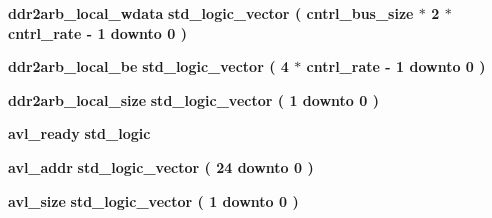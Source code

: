 \begin{DoxyCompactItemize}
\item 
{\bf ddr2arb\+\_\+local\+\_\+wdata} {\bfseries \textcolor{comment}{std\+\_\+logic\+\_\+vector}\textcolor{vhdlchar}{ }\textcolor{vhdlchar}{(}\textcolor{vhdlchar}{ }\textcolor{vhdlchar}{ }\textcolor{vhdlchar}{ }\textcolor{vhdlchar}{ }{\bfseries {\bf cntrl\+\_\+bus\+\_\+size}} \textcolor{vhdlchar}{$\ast$}\textcolor{vhdlchar}{ } \textcolor{vhdldigit}{2} \textcolor{vhdlchar}{$\ast$}\textcolor{vhdlchar}{ }\textcolor{vhdlchar}{ }\textcolor{vhdlchar}{ }{\bfseries {\bf cntrl\+\_\+rate}} \textcolor{vhdlchar}{-\/}\textcolor{vhdlchar}{ } \textcolor{vhdldigit}{1} \textcolor{vhdlchar}{ }\textcolor{keywordflow}{downto}\textcolor{vhdlchar}{ }\textcolor{vhdlchar}{ } \textcolor{vhdldigit}{0} \textcolor{vhdlchar}{ }\textcolor{vhdlchar}{)}\textcolor{vhdlchar}{ }} 
\item 
{\bf ddr2arb\+\_\+local\+\_\+be} {\bfseries \textcolor{comment}{std\+\_\+logic\+\_\+vector}\textcolor{vhdlchar}{ }\textcolor{vhdlchar}{(}\textcolor{vhdlchar}{ }\textcolor{vhdlchar}{ } \textcolor{vhdldigit}{4} \textcolor{vhdlchar}{$\ast$}\textcolor{vhdlchar}{ }\textcolor{vhdlchar}{ }\textcolor{vhdlchar}{ }{\bfseries {\bf cntrl\+\_\+rate}} \textcolor{vhdlchar}{-\/}\textcolor{vhdlchar}{ } \textcolor{vhdldigit}{1} \textcolor{vhdlchar}{ }\textcolor{keywordflow}{downto}\textcolor{vhdlchar}{ }\textcolor{vhdlchar}{ } \textcolor{vhdldigit}{0} \textcolor{vhdlchar}{ }\textcolor{vhdlchar}{)}\textcolor{vhdlchar}{ }} 
\item 
{\bf ddr2arb\+\_\+local\+\_\+size} {\bfseries \textcolor{comment}{std\+\_\+logic\+\_\+vector}\textcolor{vhdlchar}{ }\textcolor{vhdlchar}{(}\textcolor{vhdlchar}{ }\textcolor{vhdlchar}{ } \textcolor{vhdldigit}{1} \textcolor{vhdlchar}{ }\textcolor{keywordflow}{downto}\textcolor{vhdlchar}{ }\textcolor{vhdlchar}{ } \textcolor{vhdldigit}{0} \textcolor{vhdlchar}{ }\textcolor{vhdlchar}{)}\textcolor{vhdlchar}{ }} 
\item 
{\bf avl\+\_\+ready} {\bfseries \textcolor{comment}{std\+\_\+logic}\textcolor{vhdlchar}{ }} 
\item 
{\bf avl\+\_\+addr} {\bfseries \textcolor{comment}{std\+\_\+logic\+\_\+vector}\textcolor{vhdlchar}{ }\textcolor{vhdlchar}{(}\textcolor{vhdlchar}{ }\textcolor{vhdlchar}{ } \textcolor{vhdldigit}{24} \textcolor{vhdlchar}{ }\textcolor{keywordflow}{downto}\textcolor{vhdlchar}{ }\textcolor{vhdlchar}{ } \textcolor{vhdldigit}{0} \textcolor{vhdlchar}{ }\textcolor{vhdlchar}{)}\textcolor{vhdlchar}{ }} 
\item 
{\bf avl\+\_\+size} {\bfseries \textcolor{comment}{std\+\_\+logic\+\_\+vector}\textcolor{vhdlchar}{ }\textcolor{vhdlchar}{(}\textcolor{vhdlchar}{ }\textcolor{vhdlchar}{ } \textcolor{vhdldigit}{1} \textcolor{vhdlchar}{ }\textcolor{keywordflow}{downto}\textcolor{vhdlchar}{ }\textcolor{vhdlchar}{ } \textcolor{vhdldigit}{0} \textcolor{vhdlchar}{ }\textcolor{vhdlchar}{)}\textcolor{vhdlchar}{ }} 

\end{DoxyCompactItemize}
